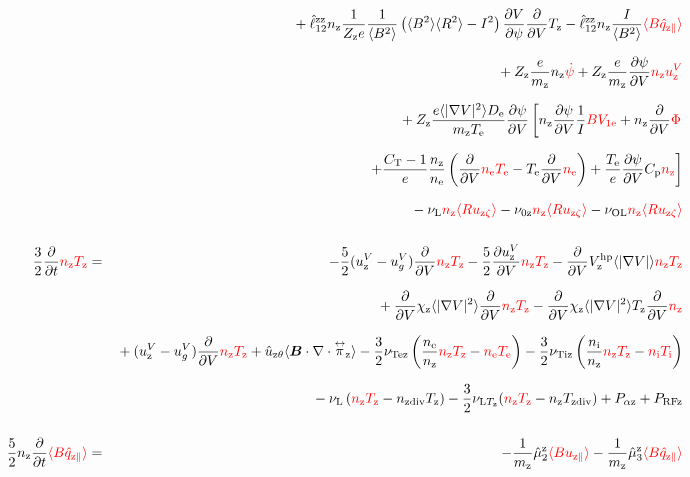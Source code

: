 \documentclass[11pt]{article}
\def\bvec#1{\leavevmode\hbox{\boldmath$#1$}}
\let\vec=\bvec
\def\r#1{{\rm#1}}
\def\aves#1{\langle#1\rangle}
\def\dd#1#2{\frac{\partial #1}{\partial #2}}
\def\tensor#1{\mathord{\displaystyle\mathop{#1}^\leftrightarrow}}
\def\para{\parallel}
\def\ddV{\frac{\partial}{\partial V}}
\def\ddt{\frac{\partial}{\partial t}}
\def\mz{m_\r{z}}
\def\nee{n_\r{e}}
\def\ni{n_\r{i}}
\def\nz{n_\r{z}}
\def\Te{T_\r{e}}
\def\Ti{T_\r{i}}
\def\Tz{T_\r{z}}
\def\Zz{Z_\r{z}}
\def\uzt#1{u_{\r{#1}\zeta}}
\def\upara#1{u_{\r{#1}\para}}
\def\uhatth#1{\hat{u}_{\r{#1}\theta}}
\def\qhatpara#1{\hat{q}_{\r{#1}\para}}
\def\uV#1{u_\r{#1}^V}
\def\ugV{u_{g}^V}
\def\chis#1{\chi_\r{#1}}
\def\De{D_\r{e}}
\def\nun#1{\nu_\r{0#1}}
\def\ndiv#1{n_\r{#1div}}
\def\Tdiv#1{T_\r{#1div}}
\def\nuLT#1{\nu_{\r{L}T_\r{#1}}}
\def\PRF#1{P_\r{RF#1}}
\def\Palp#1{P_{\alpha\r{#1}}}
\def\bri{\aves{B^2}\aves{R^2} - I^2}
\def\nuL{\nu_\r{L}}
\def\nuOL{\nu_\r{OL}}
\def\red#1{\textcolor{red}{#1}}
\begin{document}
\begin{eqnarray}
\nonumber\\[2.5mm]&&{}
  + \hat{\ell}_{12}^\r{zz} \nz \frac{1}{\Zz e} \frac{1}{\aves{B^2}} \left( \bri \right)
    \dd{V}{\psi} \ddV \Tz
  - \hat{\ell}_{12}^\r{zz} \nz \frac{I}{\aves{B^2}} \red{\aves{B \qhatpara{z}}}
\nonumber\\[2.5mm]&&{}
%
  + \Zz \frac{e}{\mz}              \nz \red{\dot{\psi}}
%
  + \Zz \frac{e}{\mz} \dd{\psi}{V} \red{\nz \uV{z}}
%
\nonumber\\[2.5mm]&&{}
%
%
  + \Zz \frac{e \aves{|\nabla V|^2} \De}{\mz\Te} \dd{\psi}{V} 
  \left[   \nz \dd{\psi}{V} \frac{1}{I} \red{B V_{1\r{e}}}
         + \nz \ddV \red{\Phi} \right.
\nonumber\\[2.5mm]&&{}
  \left. + \frac{C_\r{T}-1}{e} \frac{\nz}{\nee}
           \left( \ddV \red{\nee \Te} - \Te \ddV \red{\nee} \right)
         + \frac{\Te}{e} \dd{\psi}{V} C_\r{p} \red{\nz} \right]
\nonumber\\[2.5mm]&&{}
%
  - \nuL  \red{\nz \aves{R \uzt{z}}}
%
  - \nun{z} \red{\nz \aves{R \uzt{z}}}
%
  - \nuOL \red{\nz \aves{R \uzt{z}}}
\\[5mm]
  \frac{3}{2} \ddt \red{\nz \Tz}  &=& 
%
  - \frac{5}{2} ( \uV{z} - \ugV ) \ddV \red{\nz \Tz}
%
  - \frac{5}{2} \dd{\uV{z}}{V} \red{\nz \Tz}
%
  - \ddV V_\r{z}^\r{hp} \aves{|\nabla V|} \red{\nz \Tz}
\nonumber\\[2.5mm]&&{}
  + \ddV \chis{z} \aves{|\nabla V|^2} \ddV \red{\nz \Tz}
  - \ddV \chis{z} \aves{|\nabla V|^2} \Tz \ddV \red{\nz}
\nonumber\\[2.5mm]&&{}
%
  + ( \uV{z} - \ugV ) \ddV \red{\nz \Tz}
%
  + \uhatth{z} \aves{\vec{B}\cdot\nabla\cdot\tensor{\pi}_\r{z}}
%
  - \frac{3}{2} \nu_\r{Tez} \left(\frac{\nee}{\nz} \red{\nz \Tz} - \red{\nee \Te} \right)
  - \frac{3}{2} \nu_\r{Tiz} \left(\frac{\ni }{\nz} \red{\nz \Tz} - \red{\ni  \Ti} \right)
\nonumber\\[2.5mm]&&{}
%
  - \nuL \left(\red{\nz \Tz}  - \ndiv{z} \Tz \right)
%
  - \frac{3}{2} \nuLT{z} (\red{\nz \Tz} - \nz \Tdiv{z})
%
  + \Palp{z}
%
  + \PRF{z}
\\[5mm]
 \frac{5}{2} \nz \ddt \red{\aves{B \qhatpara{z}}} &=&
%
  - \frac{1}{\mz} \hat{\mu}_2^\r{z} \red{\aves{B \upara{z}}}
  - \frac{1}{\mz} \hat{\mu}_3^\r{z} \red{\aves{B \qhatpara{z}}}

\end{eqnarray}
\end{document}
